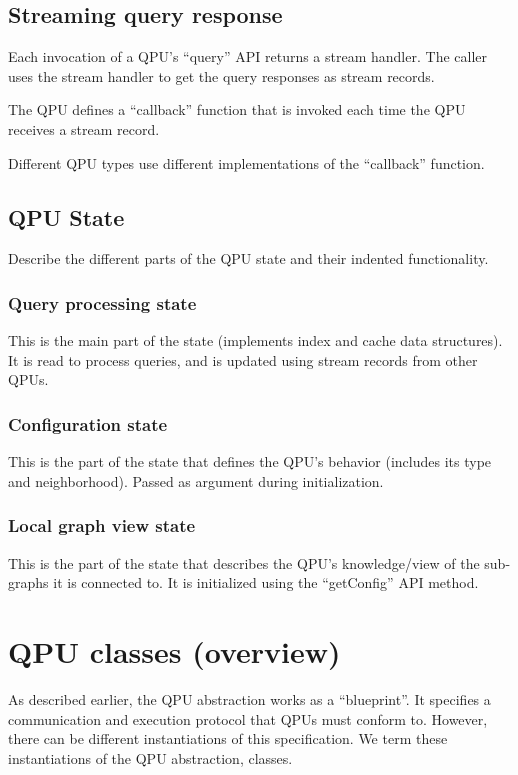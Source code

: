\subsection{Streaming query response}
Each invocation of a QPU's ``query'' API returns a stream handler.
The caller uses the stream handler to get the query responses as stream records.

The QPU defines a ``callback'' function that is invoked each time the QPU
receives a stream record.

Different QPU types use different implementations of the ``callback''
function.

\subsection{QPU State}
Describe the different parts of the QPU state and their indented functionality.

\subsubsection{Query processing state}
This is the main part of the state (implements index and cache data structures).
It is read to process queries, and is updated using stream records from other
QPUs.
\subsubsection{Configuration state}
This is the part of the state that defines the QPU's behavior (includes its type
and neighborhood).
Passed as argument during initialization.

\subsubsection{Local graph view state}
This is the part of the state that describes the QPU's knowledge/view of the
sub-graphs it is connected to.
It is initialized using the ``getConfig'' API method.

\section{QPU classes (overview)}
\label{sec:qpu_classes}

As described earlier, the QPU abstraction works as a ``blueprint''.
It specifies a communication and execution protocol that QPUs must conform to.
However, there can be different instantiations of this specification.
We term these instantiations of the QPU abstraction, classes.

